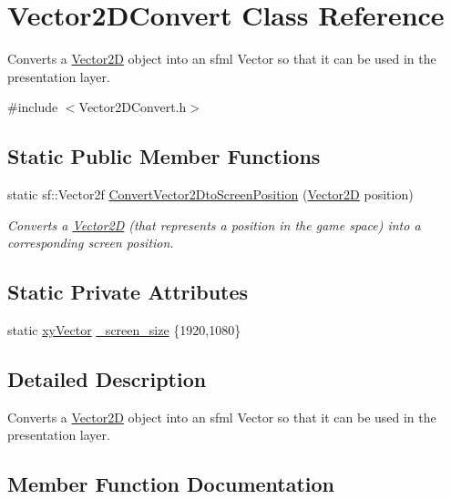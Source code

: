 \hypertarget{class_vector2_d_convert}{}\section{Vector2\+D\+Convert Class Reference}
\label{class_vector2_d_convert}


Converts a \hyperlink{class_vector2_d}{Vector2D} object into an sfml Vector so that it can be used in the presentation layer.  




{\ttfamily \#include $<$Vector2\+D\+Convert.\+h$>$}

\subsection*{Static Public Member Functions}
\begin{DoxyCompactItemize}
\item 
static sf\+::\+Vector2f \hyperlink{class_vector2_d_convert_aa026e2253e634035a2ea0d72d28883de}{Convert\+Vector2\+Dto\+Screen\+Position} (\hyperlink{class_vector2_d}{Vector2D} position)
\begin{DoxyCompactList}\small\item\em Converts a \hyperlink{class_vector2_d}{Vector2D} (that represents a position in the game space) into a corresponding screen position. \end{DoxyCompactList}\end{DoxyCompactItemize}
\subsection*{Static Private Attributes}
\begin{DoxyCompactItemize}
\item 
static \hyperlink{structxy_vector}{xy\+Vector} \hyperlink{class_vector2_d_convert_a6eef0a8081bf94301b98332ef362be2c}{\+\_\+screen\+\_\+size} \{1920,1080\}
\end{DoxyCompactItemize}


\subsection{Detailed Description}
Converts a \hyperlink{class_vector2_d}{Vector2D} object into an sfml Vector so that it can be used in the presentation layer. 

\subsection{Member Function Documentation}
\mbox{\label{class_vector2_d_convert_aa026e2253e634035a2ea0d72d28883de}} 

